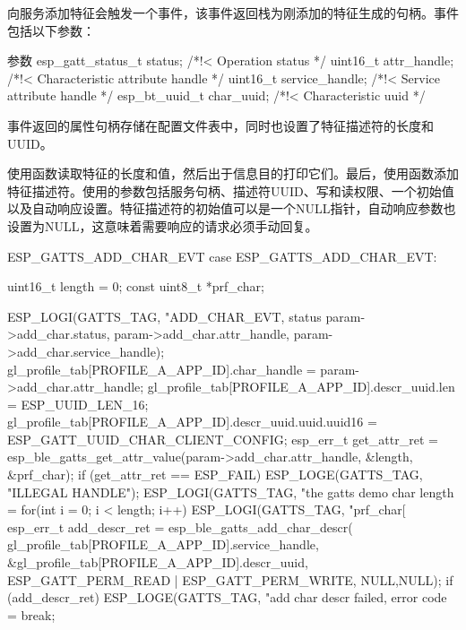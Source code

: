 \documentclass[lang=cn,newtx,10pt,scheme=chinese]{elegantbook}
\begin{document}
向服务添加特征会触发一个事件，该事件返回栈为刚添加的特征生成的句柄。事件包括以下参数：

\begin{mycode}{参数}
esp_gatt_status_t status;          /*!< Operation status */
uint16_t attr_handle;              /*!< Characteristic attribute handle */
uint16_t service_handle;           /*!< Service attribute handle */
esp_bt_uuid_t char_uuid;           /*!< Characteristic uuid */
\end{mycode}

事件返回的属性句柄存储在配置文件表中，同时也设置了特征描述符的长度和UUID。

使用函数读取特征的长度和值，然后出于信息目的打印它们。最后，使用函数添加特征描述符。使用的参数包括服务句柄、描述符UUID、写和读权限、一个初始值以及自动响应设置。特征描述符的初始值可以是一个NULL指针，自动响应参数也设置为NULL，这意味着需要响应的请求必须手动回复。

\begin{mycode}{ESP\_GATTS\_ADD\_CHAR\_EVT}
    case ESP_GATTS_ADD_CHAR_EVT: {
         uint16_t length = 0;
         const uint8_t *prf_char;

         ESP_LOGI(GATTS_TAG, "ADD_CHAR_EVT, status %
                 param->add_char.status, param->add_char.attr_handle, param->add_char.service_handle);  
                 gl_profile_tab[PROFILE_A_APP_ID].char_handle = param->add_char.attr_handle;
                 gl_profile_tab[PROFILE_A_APP_ID].descr_uuid.len = ESP_UUID_LEN_16;  
                 gl_profile_tab[PROFILE_A_APP_ID].descr_uuid.uuid.uuid16 = ESP_GATT_UUID_CHAR_CLIENT_CONFIG;  
                 esp_err_t get_attr_ret = esp_ble_gatts_get_attr_value(param->add_char.attr_handle, &length, &prf_char);         
         if (get_attr_ret == ESP_FAIL){  
            ESP_LOGE(GATTS_TAG, "ILLEGAL HANDLE");
         }
         ESP_LOGI(GATTS_TAG, "the gatts demo char length = %
         for(int i = 0; i < length; i++){
             ESP_LOGI(GATTS_TAG, "prf_char[%
         }       
         esp_err_t add_descr_ret = esp_ble_gatts_add_char_descr(  
                                 gl_profile_tab[PROFILE_A_APP_ID].service_handle,  
                                 &gl_profile_tab[PROFILE_A_APP_ID].descr_uuid,  
                                 ESP_GATT_PERM_READ | ESP_GATT_PERM_WRITE,  
                                 NULL,NULL);
         if (add_descr_ret){
            ESP_LOGE(GATTS_TAG, "add char descr failed, error code = %
         }
         break;
    }
\end{mycode}
\end{document}
